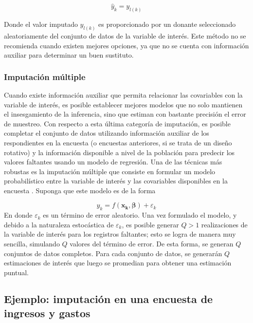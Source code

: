 \[\hat{y}_k = y_{l(k)}\]

Donde el valor imputado \(y_{l(k)}\) es proporcionado por un donante seleccionado aleatoriamente del conjunto de datos de la variable de interés. Este método no se recomienda cuando existen mejores opciones, ya que no se cuenta con información auxiliar para determinar un buen sustituto.

\hypertarget{imputacion-multiple}{%
\subsubsection*{Imputación múltiple}\label{imputacion-multiple}}


Cuando existe información auxiliar que permita relacionar las covariables con la variable de interés, es posible establecer mejores modelos que no solo mantienen el insesgamiento de la inferencia, sino que estiman con bastante precisión el error de muestreo. Con respecto a esta última categoría de imputación, es posible completar el conjunto de datos utilizando información auxiliar de los respondientes en la encuesta (o encuestas anteriores, si se trata de un diseño rotativo) y la información disponible a nivel de la población para predecir los valores faltantes usando un modelo de regresión. Una de las técnicas más robustas es la imputación múltiple que consiste en formular un modelo probabilístico entre la variable de interés y las covariables disponibles en la encuesta \citep{Rubin_1987}. Suponga que este modelo es de la forma

\[y_k = f(\mathbf{x_k},\boldsymbol{\beta}) + \varepsilon_k \]
En donde \(\varepsilon_k\) es un término de error aleatorio. Una vez formulado el modelo, y debido a la naturaleza estocástica de \(\varepsilon_k\), es posible generar \(Q>1\) realizaciones de la variable de interés para los registros faltantes; esto se logra de manera muy sencilla, simulando \(Q\) valores del término de error. De esta forma, se generan \(Q\) conjuntos de datos completos. Para cada conjunto de datos, se generarán \(Q\) estimaciones de interés que luego se promedian para obtener una estimación puntual.

\hypertarget{ejemplo-imputacion-en-una-encuesta-de-ingresos-y-gastos}{%
\subsection{Ejemplo: imputación en una encuesta de ingresos y gastos}\label{ejemplo-imputacion-en-una-encuesta-de-ingresos-y-gastos}}


